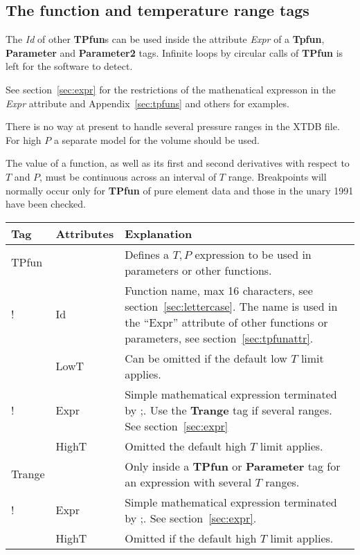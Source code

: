 \documentclass{article}
\begin{document}
\subsection{The function and temperature range tags}\label{sec:tpfun}

The {\em Id} of other {\bf TPfun}s can be used inside the attribute
{\em Expr} of a {\bf Tpfun}, {\bf Parameter} and {\bf Parameter2}
tags.  Infinite loops by circular calls of {\bf TPfun} is left for the
software to detect.

See section~\ref{sec:expr} for the restrictions of the mathenatical
expresson in the {\em Expr} attribute and Appendix~\ref{sec:tpfuns}
and others for examples.

There is no way at present to handle several pressure ranges in the
XTDB file.  For high $P$ a separate model for the volume should be
used.

The value of a function, as well as its first and second derivatives
with respect to $T$ and $P$, must be continuous across an interval of
$T$ range.  Breakpoints will normally occur only for {\bf TPfun} of
pure element data and those in the unary 1991 have been checked.

\begin{tabular}{|p{} p{} p{}|}\hline
  Tag & Attributes & Explanation\\\hline

  TPfun & & Defines a $T, P$ expression to be used in parameters or other functions.\\
!        & Id & Function name, max 16 characters, see 
           section~\ref{sec:lettercase}.  The name is used in the
         ``Expr'' attribute of other functions or parameters, 
           see section~\ref{sec:tpfunattr}.\\
        & LowT & Can be omitted if the default low $T$ limit applies.\\
!       & Expr &  Simple mathematical expression terminated by ;.   Use the {\bf Trange} tag if several ranges.  See section~\ref{sec:expr}\\
        & HighT & Omitted the default high $T$ limit applies.\\\hline

  Trange & & Only inside a {\bf TPfun} or {\bf Parameter} tag for an expression with several $T$ ranges.\\ 
!         & Expr & Simple mathematical expression terminated by ;.  See section~\ref{sec:expr}.\\
         & HighT & Omitted if the default high $T$ limit applies.\\\hline
\end{tabular}
\end{document}
